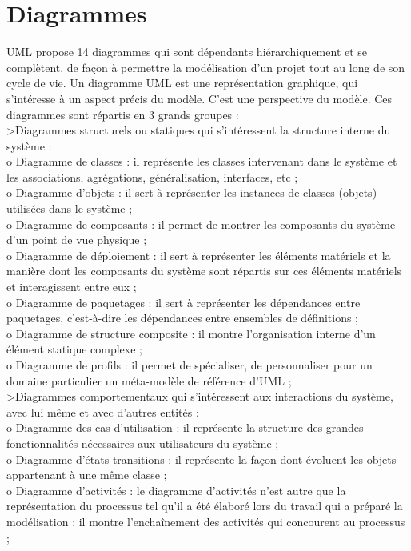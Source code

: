 \section{Diagrammes}
UML propose 14 diagrammes qui sont dépendants hiérarchiquement et se complètent, de façon à permettre la modélisation d'un projet tout au long de son cycle de vie. Un diagramme UML est une représentation graphique, qui s'intéresse à un aspect précis du modèle. C'est une perspective du modèle. Ces diagrammes sont répartis en 3 grands groupes : \\
\textgreater Diagrammes structurels ou statiques qui s'intéressent la structure interne du système : \\
o Diagramme de classes : il représente les classes intervenant dans le système et les
associations, agrégations, généralisation, interfaces, etc ;\\
o Diagramme d'objets : il sert à représenter les instances de classes (objets) utilisées dans le système ;\\
o Diagramme de composants : il permet de montrer les composants du système d'un point de vue physique ; \\
o Diagramme de déploiement : il sert à représenter les éléments matériels et la manière dont les composants du système sont répartis sur ces éléments matériels et interagissent entre eux ;\\
o Diagramme de paquetages : il sert à représenter les dépendances entre paquetages, c’est-à-dire les dépendances entre ensembles de définitions ;\\
o Diagramme de structure composite : il montre l’organisation interne d’un élément statique complexe ;\\
o Diagramme de profils : il permet de spécialiser, de personnaliser pour un domaine particulier un méta-modèle de référence d'UML ;\\
\textgreater Diagrammes comportementaux qui s'intéressent aux interactions du système, avec lui même et avec d'autres entités : \\
o Diagramme des cas d'utilisation : il représente la structure des grandes fonctionnalités nécessaires aux utilisateurs du système ;\\ 
o Diagramme d'états-transitions : il représente la façon dont évoluent les objets appartenant à une même classe ; \\
o Diagramme d'activités : le diagramme d'activités n'est autre que la représentation du processus tel qu'il a été élaboré lors du travail qui a préparé la modélisation : il montre l'enchaînement des activités qui concourent au processus ; \\
